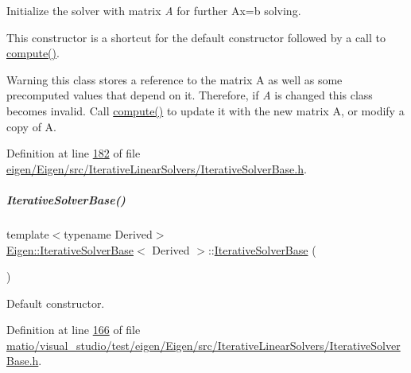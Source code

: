 Initialize the solver with matrix {\itshape A} for further {\ttfamily Ax=b} solving.

This constructor is a shortcut for the default constructor followed by a call to \hyperlink{group___iterative_linear_solvers___module_a7dfa55c55e82d697bde227696a630914}{compute()}.

\begin{DoxyWarning}{Warning}
this class stores a reference to the matrix A as well as some precomputed values that depend on it. Therefore, if {\itshape A} is changed this class becomes invalid. Call \hyperlink{group___iterative_linear_solvers___module_a7dfa55c55e82d697bde227696a630914}{compute()} to update it with the new matrix A, or modify a copy of A. 
\end{DoxyWarning}


Definition at line \hyperlink{eigen_2_eigen_2src_2_iterative_linear_solvers_2_iterative_solver_base_8h_source_l00182}{182} of file \hyperlink{eigen_2_eigen_2src_2_iterative_linear_solvers_2_iterative_solver_base_8h_source}{eigen/\+Eigen/src/\+Iterative\+Linear\+Solvers/\+Iterative\+Solver\+Base.\+h}.

\mbox{\label{group___iterative_linear_solvers___module_a0922f2be45082690d7734aa6732fc493}} 
\subparagraph{\texorpdfstring{Iterative\+Solver\+Base()}{IterativeSolverBase()}\hspace{0.1cm}{\footnotesize\ttfamily [3/4]}}
{\footnotesize\ttfamily template$<$typename Derived$>$ \\
\hyperlink{group___iterative_linear_solvers___module_class_eigen_1_1_iterative_solver_base}{Eigen\+::\+Iterative\+Solver\+Base}$<$ Derived $>$\+::\hyperlink{group___iterative_linear_solvers___module_class_eigen_1_1_iterative_solver_base}{Iterative\+Solver\+Base} (\begin{DoxyParamCaption}{ }\end{DoxyParamCaption})\hspace{0.3cm}{\ttfamily [inline]}}

Default constructor. 

Definition at line \hyperlink{matio_2visual__studio_2test_2eigen_2_eigen_2src_2_iterative_linear_solvers_2_iterative_solver_base_8h_source_l00166}{166} of file \hyperlink{matio_2visual__studio_2test_2eigen_2_eigen_2src_2_iterative_linear_solvers_2_iterative_solver_base_8h_source}{matio/visual\+\_\+studio/test/eigen/\+Eigen/src/\+Iterative\+Linear\+Solvers/\+Iterative\+Solver\+Base.\+h}.

